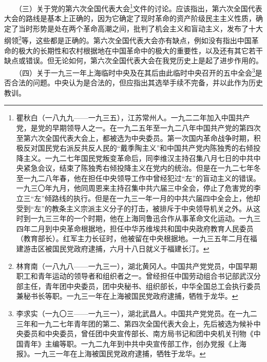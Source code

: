 \documentclass[cn,11pt,chinese]{elegantbook}
\begin{document}
　　（三）关于党的第六次全国代表大会\footnote[6]{ 瞿秋白（一八九九——一九三五），江苏常州人。一九二二年加入中国共产党，是党的早期领导人之一。在一九二五年至一九二八年中国共产党的第四次至第六次全国代表大会上，都被选为中央委员。第一次国内革命战争时期，积极反对国民党右派反共反人民的“戴季陶主义”和中国共产党内陈独秀的右倾投降主义。一九二七年国民党叛变革命后，同李维汉主持召集八月七日的中共中央紧急会议，结束了陈独秀右倾投降主义在党内的统治。但是在一九二七年冬至一九二八年春，他在担任中央领导工作中曾经犯过“左”的盲动主义的错误。一九三〇年九月，他同周恩来主持召集中共六届三中全会，停止了危害党的李立三“左”倾路线的执行。但是在一九三一年一月的中共六届四中全会上，他却受到“左”的教条主义宗派主义分子的打击，被排斥于中央领导机关之外。从这时到一九三三年的一个时期，他在上海同鲁迅合作从事革命文化运动。一九三四年二月到中央革命根据地，担任中华苏维埃共和国中央政府教育人民委员（教育部长）。红军主力长征时，他被留在中央根据地。一九三五年二月在福建游击区被国民党政府逮捕，六月十八日就义于福建长汀。}文件的讨论。应该指出，第六次全国代表大会的路线是基本上正确的，因为它确定了现时革命的资产阶级民主主义性质，确定了当时形势是处在两个革命高潮之间，批判了机会主义和盲动主义，发布了十大纲领\footnote[7]{ 林育南（一八九八——一九三一），湖北黄冈人。中国共产党党员，中国早期职工和青年运动的领导者和组织者之一。曾经担任中国劳动组合书记部武汉分部主任，青年团中央委员，团中央秘书、组织部长，中华全国总工会执行委员兼秘书长等职。一九三一年在上海被国民党政府逮捕，牺牲于龙华。}等，这些都是正确的。第六次全国代表大会亦有缺点，例如没有指出中国革命的极大的长期性和农村根据地在中国革命中的极大的重要性，以及还有其它若干缺点或错误。但无论如何，第六次全国代表大会在我党历史上是起了进步作用的。\\
　　（四）关于一九三一年上海临时中央及在其后由此临时中央召开的五中全会\footnote[8]{ 李求实（一九〇三——一九三一），湖北武昌人。中国共产党党员。在一九二三年和一九二七年青年团的第二、第四次全国代表大会上，先后被选为候补中央委员和中央委员，曾任团中央宣传部长、南方局书记和团中央机关刊物《中国青年》主编等职。一九二九年到中共中央宣传部工作，创办党报《上海报》。一九三一年在上海被国民党政府逮捕，牺牲于龙华。}是否合法的问题。中央认为是合法的，但应指出其选举手续不完备，并以此作为历史教训。\\
\end{document}
